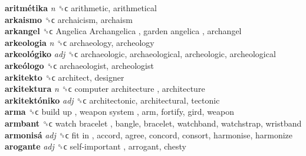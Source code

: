 \textbf{aritmétika} \emph{n}  ␝ϲ  arithmetic, arithmetical  \\
\textbf{arkaismo} ␝ϲ  archaicism, archaism  \\
\textbf{arkangel} ␝ϲ   Angelica Archangelica ,  garden angelica , archangel  \\
\textbf{arkeologia} \emph{n}  ␝ϲ  archaeology, archeology  \\
\textbf{arkeológiko} \emph{adj}  ␝ϲ  archaeologic, archaeological, archeologic, archeological  \\
\textbf{arkeólogo} ␝ϲ  archaeologist, archeologist  \\
\textbf{arkitekto} ␝ϲ  architect, designer  \\
\textbf{arkitektura} \emph{n}  ␝ϲ   computer architecture , architecture  \\
\textbf{arkitektóniko} \emph{adj}  ␝ϲ  architectonic, architectural, tectonic  \\
\textbf{arma} ␝ϲ   build up ,  weapon system , arm, fortify, gird, weapon  \\
\textbf{armbant} ␝ϲ   watch bracelet , bangle, bracelet, watchband, watchstrap, wristband  \\
\textbf{armonisá} \emph{adj}  ␝ϲ   fit in , accord, agree, concord, consort, harmonise, harmonize  \\
\textbf{arogante} \emph{adj}  ␝ϲ   self-important , arrogant, chesty  \\
